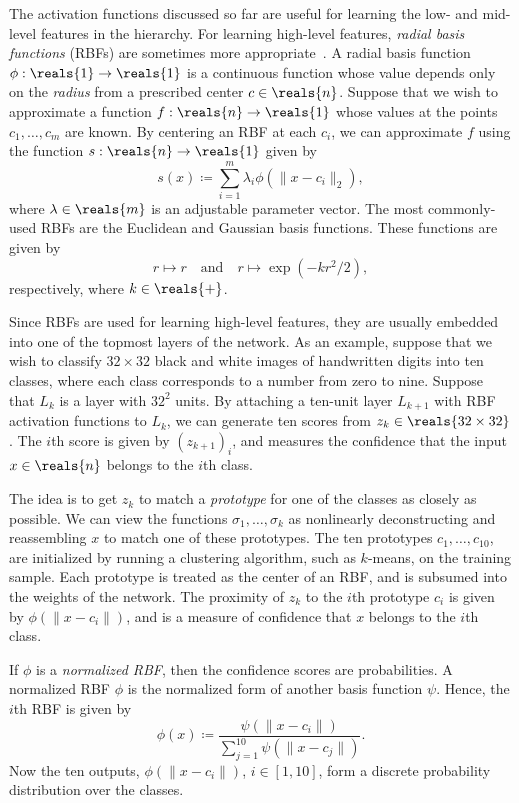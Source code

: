 \documentclass[11pt,a4paper]{article}
\numberwithin{equation}{section}
\begin{document}
The activation functions discussed so far are useful for learning the low- and
mid-level features in the hierarchy. For learning high-level features,
\emph{radial basis functions} (RBFs) are sometimes more
appropriate~\citep{lecun-01a}. A radial basis function $\phi : \reals{1} \to
\reals{1}$ is a continuous function whose value depends only on the
\emph{radius} from a prescribed center $c \in \reals{n}$. Suppose that we wish
to approximate a function $f : \reals{n} \to \reals{1}$ whose values at the
points $c_1, \ldots, c_m$ are known. By centering an RBF at each $c_i$, we can
approximate $f$ using the function $s : \reals{n} \to \reals{1}$ given by
\begin{equation}
	s(x) \coloneqq \sum_{i = 1}^m \lambda_i \phi(\|x - c_i\|_2),
	\label{eq:rbf_sum}
\end{equation}
where $\lambda \in \reals{m}$ is an adjustable parameter vector. The most
commonly-used RBFs are the Euclidean and Gaussian basis functions. These
functions are given by
\[
	r \mapsto r \quad\text{and}\quad r \mapsto \exp(-k r^2 / 2),
\]
respectively, where $k \in \reals{+}$.

Since RBFs are used for learning high-level features, they are usually embedded
into one of the topmost layers of the network. As an example, suppose that we
wish to classify $32 \times 32$ black and white images of handwritten digits
into ten classes, where each class corresponds to a number from zero to nine.
Suppose that $L_k$ is a layer with $32^2$ units. By attaching a ten-unit layer
$L_{k + 1}$ with RBF activation functions to $L_k$, we can generate ten scores
from $z_k \in \reals{32 \times 32}$. The $i$th score is given by $(z_{k +
1})_i$, and measures the confidence that the input $x \in \reals{n}$ belongs to
the $i$th class.

The idea is to get $z_k$ to match a \emph{prototype} for one of the classes as
closely as possible. We can view the functions $\sigma_1, \ldots, \sigma_k$ as
nonlinearly deconstructing and reassembling $x$ to match one of these
prototypes. The ten prototypes $c_1, \ldots, c_{10}$, are initialized by running
a clustering algorithm, such as $k$-means, on the training sample. Each
prototype is treated as the center of an RBF, and is subsumed into the weights
of the network. The proximity of $z_k$ to the $i$th prototype $c_i$ is given by
$\phi(\|x - c_i\|)$, and is a measure of confidence that $x$ belongs to the
$i$th class.

If $\phi$ is a \emph{normalized RBF}, then the confidence scores are
probabilities. A normalized RBF $\phi$ is the normalized form of another basis
function $\psi$. Hence, the $i$th RBF is given by
\begin{equation}
	\phi(x) \coloneqq \frac{\psi(\|x - c_i\|)}
		{\sum_{j = 1}^{10} \psi(\|x - c_j\|)}.
	\label{eq:normalized_rbf}
\end{equation}
Now the ten outputs, $\phi(\|x - c_i\|)$, $i \in [1, 10]$, form a discrete
probability distribution over the classes.
\end{document}
